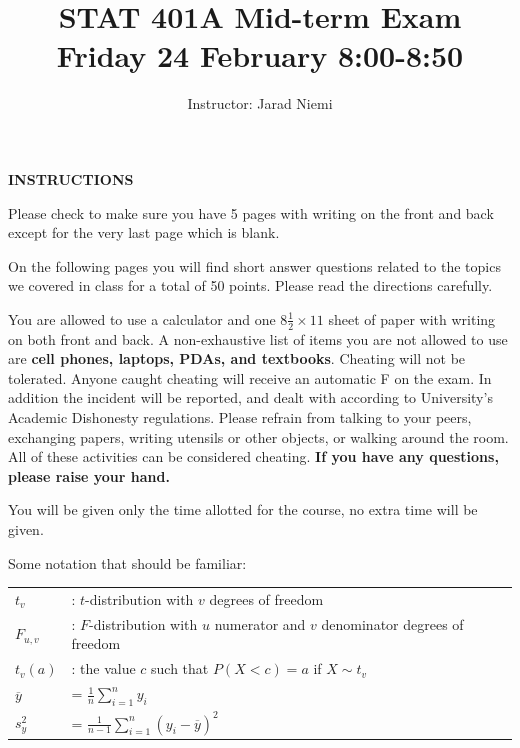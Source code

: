 \documentclass[10pt,draft]{article}
\title{STAT 401A Mid-term Exam \\ Friday 24 February 8:00-8:50}
\author{Instructor: Jarad Niemi}
\date{}
\begin{document}
\maketitle


\bigskip


\textbf{INSTRUCTIONS}

Please check to make sure you have 5 pages with writing on the front and back except for the very last page which is blank.

\bigskip

On the following pages you will find short answer questions related to the topics we covered in class for a total of 50 points. Please read the directions carefully.

\bigskip

You are allowed to use a calculator and one $8\frac{1}{2}\times 11$ sheet of paper with writing on both front and back. A non-exhaustive list of items you are not allowed to use are {\bf cell phones, laptops, PDAs, and textbooks}. Cheating will not be tolerated. Anyone caught cheating will receive an automatic F on the exam. In addition the incident will be reported, and dealt with according to University's Academic Dishonesty regulations. Please refrain from talking to your peers, exchanging papers, writing utensils or other objects, or walking around the room. All of these activities can be considered cheating. {\bf If you have any questions, please raise your hand.}

\bigskip

You will be given only the time allotted for the course, no extra time will be given.

\bigskip

Some notation that should be familiar:
\begin{center}
\begin{tabular}{ll}
$t_v$ &: $t$-distribution with $v$ degrees of freedom \\
$F_{u,v}$ &: $F$-distribution with $u$ numerator and $v$ denominator degrees of freedom \\
\hline
$t_{v}(a)$ &: the value $c$ such that $P(X<c)=a$ if $X\sim t_v$ \\
\hline
$\overline{y}$ &= $\frac{1}{n} \sum_{i=1}^n y_i$ \\
$s_y^2$ &= $\frac{1}{n-1} \sum_{i=1}^n (y_i-\overline{y})^2$ \\
\end{tabular}
\end{center}
\end{document}
